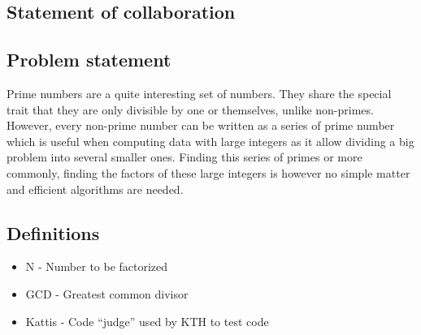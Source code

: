 \subsection{Statement of collaboration}

\subsection{Problem statement}
Prime numbers are a quite interesting set of numbers. They share the special trait that they are only divisible by one or themselves, unlike non-primes. However, every non-prime number can be written as a series of prime number which is useful when computing data with large integers as it allow dividing a big problem into several smaller ones.
Finding this series of primes or more commonly, finding the factors of these large integers is however no simple matter and efficient algorithms are needed.

\subsection{Definitions}
	
\begin{itemize}
  \item N - Number to be factorized
  \item GCD - Greatest common divisor
  \item Kattis - Code “judge” used by KTH to test code
\end{itemize}